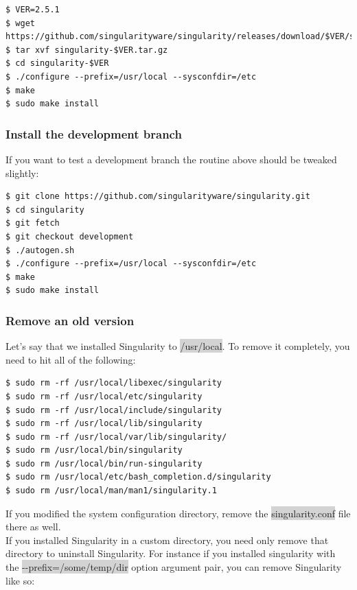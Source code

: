 \documentclass[a4paper]{article}
\begin{document}
\begin{lstlisting}[frame=single]  
$ VER=2.5.1
$ wget https://github.com/singularityware/singularity/releases/download/$VER/singularity-$VER.tar.gz
$ tar xvf singularity-$VER.tar.gz
$ cd singularity-$VER
$ ./configure --prefix=/usr/local --sysconfdir=/etc
$ make
$ sudo make install

\end{lstlisting}

\subsubsection{Install the development branch}

If you want to test a development branch the routine above should be tweaked slightly:\\

\begin{lstlisting}[frame=single]  
$ git clone https://github.com/singularityware/singularity.git
$ cd singularity
$ git fetch
$ git checkout development
$ ./autogen.sh
$ ./configure --prefix=/usr/local --sysconfdir=/etc
$ make
$ sudo make install
\end{lstlisting}

\subsubsection{Remove an old version}

Let’s say that we installed Singularity to \colorbox{lightgray}{/usr/local}. To remove it completely, you need to hit all of the following:


\begin{lstlisting}[frame=single]  
$ sudo rm -rf /usr/local/libexec/singularity
$ sudo rm -rf /usr/local/etc/singularity
$ sudo rm -rf /usr/local/include/singularity
$ sudo rm -rf /usr/local/lib/singularity
$ sudo rm -rf /usr/local/var/lib/singularity/
$ sudo rm /usr/local/bin/singularity
$ sudo rm /usr/local/bin/run-singularity
$ sudo rm /usr/local/etc/bash_completion.d/singularity 
$ sudo rm /usr/local/man/man1/singularity.1
\end{lstlisting}


If you modified the system configuration directory, remove the \colorbox{lightgray}{singularity.conf} file there as well.\\

If you installed Singularity in a custom directory, you need only remove that directory to uninstall Singularity. For instance if you installed singularity with the \colorbox{lightgray}{-{}-prefix=/some/temp/dir} option argument pair, you can remove Singularity like so:
\end{document}
